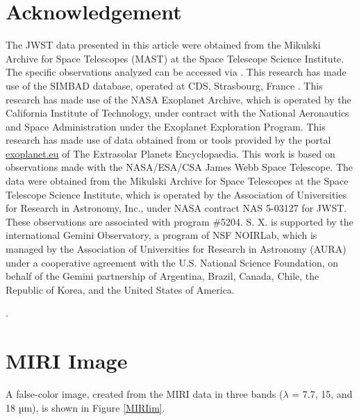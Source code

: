 \documentclass[twocolumn]{aastex631}
\begin{document}
\section*{Acknowledgement}
{ The JWST data presented in this article were obtained from the Mikulski Archive for Space Telescopes (MAST) at the Space Telescope Science Institute. The specific observations analyzed can be accessed via .} This research has made use of the SIMBAD database,
operated at CDS, Strasbourg, France \citep{2000A&AS..143....9W}.
This research has made use of the NASA Exoplanet Archive, which is operated by the California Institute of Technology, under contract with the National Aeronautics and Space Administration under the Exoplanet Exploration Program. This research has made use of data obtained from or tools provided by the portal \url{exoplanet.eu} of The Extrasolar
Planets Encyclopaedia.
This work is based on observations made with the NASA/ESA/CSA James Webb Space Telescope. The data were obtained from the Mikulski Archive for Space Telescopes at the Space Telescope Science Institute, which is operated by the Association of Universities for Research in Astronomy, Inc., under NASA contract NAS 5-03127 for JWST.  These observations are associated with program \#5204. S. X. is supported by the international Gemini Observatory, a program of NSF NOIRLab, which is managed by the Association of Universities for Research in Astronomy (AURA) under a cooperative agreement with the U.S. National Science Foundation, on behalf of the Gemini partnership of Argentina, Brazil, Canada, Chile, the Republic of Korea, and the United States of America.

.





\appendix
\vspace{-6mm}


\section{MIRI Image}\label{AppB}
A false-color image, created from the MIRI data in three bands ($\lambda$ = 7.7, 15, and 18 µm), is shown in Figure \ref{MIRIim}.
\end{document}
